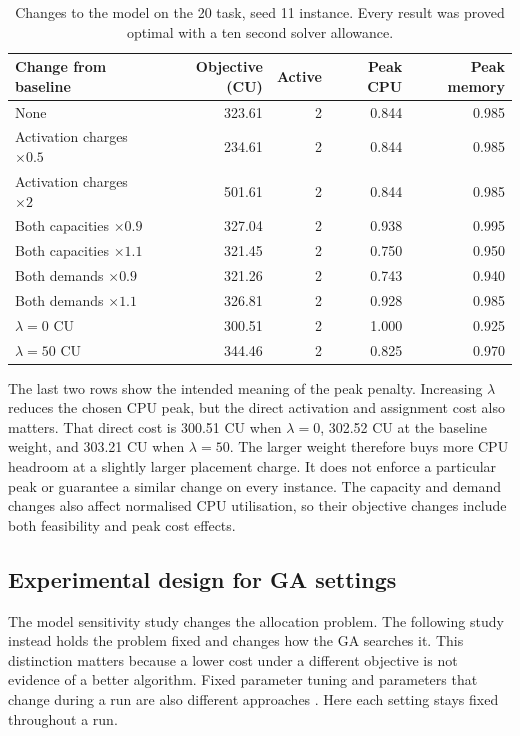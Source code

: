 \documentclass[10pt,a4paper]{article}
\begin{document}
\begin{table}[htbp]
\centering
\caption{Changes to the model on the 20 task, seed 11 instance. Every result was proved optimal with a ten second solver allowance.}
\label{tab:model-sensitivity}
\small
\begin{tabular}{lrrrr}
\toprule
Change from baseline & Objective (CU) & Active & Peak CPU & Peak memory \\
\midrule
None & 323.61 & 2 & 0.844 & 0.985 \\
Activation charges $\times0.5$ & 234.61 & 2 & 0.844 & 0.985 \\
Activation charges $\times2$ & 501.61 & 2 & 0.844 & 0.985 \\
Both capacities $\times0.9$ & 327.04 & 2 & 0.938 & 0.995 \\
Both capacities $\times1.1$ & 321.45 & 2 & 0.750 & 0.950 \\
Both demands $\times0.9$ & 321.26 & 2 & 0.743 & 0.940 \\
Both demands $\times1.1$ & 326.81 & 2 & 0.928 & 0.985 \\
$\lambda=0$ CU & 300.51 & 2 & 1.000 & 0.925 \\
$\lambda=50$ CU & 344.46 & 2 & 0.825 & 0.970 \\
\bottomrule
\end{tabular}
\end{table}

The last two rows show the intended meaning of the peak penalty. Increasing
$\lambda$ reduces the chosen CPU peak, but the direct activation and assignment
cost also matters. That direct cost is 300.51 CU when $\lambda=0$, 302.52 CU
at the baseline weight, and 303.21 CU when $\lambda=50$. The larger weight
therefore buys more CPU headroom at a slightly larger placement charge. It does
not enforce a particular peak or guarantee a similar change on every instance.
The capacity and demand changes also affect normalised CPU utilisation, so their
objective changes include both feasibility and peak cost effects.

\subsection{Experimental design for GA settings}

The model sensitivity study changes the allocation problem. The following
study instead holds the problem fixed and changes how the GA searches it.
This distinction matters because a lower cost under a different objective is
not evidence of a better algorithm. Fixed parameter tuning and parameters that
change during a run are also different approaches \cite{eiben1999}. Here each
setting stays fixed throughout a run.
\end{document}
